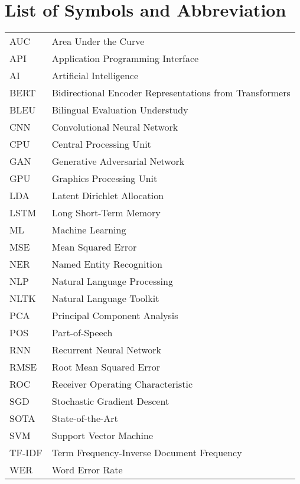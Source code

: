 				\chapter*{List of Symbols and Abbreviation}
			\endgroup
   
		\normalsize
		\begin{tabular}{p{1in}p{5in}} 
			AUC & Area Under the Curve\\
			API & Application Programming Interface\\
			AI & Artificial Intelligence\\
			BERT & Bidirectional Encoder Representations from Transformers\\
			BLEU & Bilingual Evaluation Understudy\\
			CNN & Convolutional Neural Network\\
			CPU & Central Processing Unit\\
			GAN & Generative Adversarial Network\\
			GPU & Graphics Processing Unit\\
			LDA & Latent Dirichlet Allocation\\
			LSTM & Long Short-Term Memory\\
			ML & Machine Learning\\
			MSE & Mean Squared Error\\
			NER & Named Entity Recognition\\
			NLP & Natural Language Processing\\
			NLTK & Natural Language Toolkit\\
			PCA & Principal Component Analysis\\
			POS & Part-of-Speech\\
			RNN & Recurrent Neural Network\\
			RMSE & Root Mean Squared Error\\
			ROC & Receiver Operating Characteristic\\
			SGD & Stochastic Gradient Descent\\
			SOTA & State-of-the-Art\\
			SVM & Support Vector Machine\\
			TF-IDF & Term Frequency-Inverse Document Frequency\\
			WER & Word Error Rate\\
			\end{tabular}





		\break
		\pagebreak
		
	